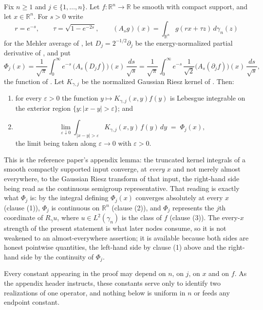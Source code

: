 \begin{lemma}
Fix $n \geq 1$ and $j \in \{1,\ldots,n\}$.  Let $f : \mathbb{R}^n \to \mathbb{R}$
be smooth with compact support, and let $x \in \mathbb{R}^n$.  For $s > 0$ write
\[
  r = e^{-s},\qquad \tau = \sqrt{1-e^{-2s}},\qquad
  (A_sg)(x) = \int_{\mathbb{R}^n} g(rx+\tau z)\,d\gamma_n(z)
\]
for the Mehler average of , let $D_j = 2^{-1/2}\partial_j$
be the energy-normalized partial derivative of , and put
\[
  \Phi_j(x) = \frac{1}{\sqrt\pi}\int_0^\infty
      e^{-s}\,\bigl(A_s(D_jf)\bigr)(x)\,\frac{ds}{\sqrt s}
    = \frac{1}{\sqrt\pi}\int_0^\infty
      e^{-s}\,\frac{1}{\sqrt2}\bigl(A_s(\partial_jf)\bigr)(x)\,\frac{ds}{\sqrt s} ,
\]
the function of .  Let $K_{\gamma,j}$ be the
normalized Gaussian Riesz kernel of .  Then:
\begin{enumerate}
\item for every $\varepsilon > 0$ the function $y \mapsto K_{\gamma,j}(x,y)f(y)$
is Lebesgue integrable on the exterior region $\{y : |x-y| > \varepsilon\}$; and
\item
\[
  \lim_{\varepsilon\downarrow0}
    \int_{|x-y|>\varepsilon}K_{\gamma,j}(x,y)\,f(y)\,dy
  \;=\; \Phi_j(x) ,
\]
the limit being taken along $\varepsilon \to 0$ with $\varepsilon > 0$.
\end{enumerate}

This is the reference paper's appendix lemma: the truncated kernel integrals of
a smooth compactly supported input converge, at \emph{every} $x$ and not merely
almost everywhere, to the Gaussian Riesz transform of that input, the
right-hand side being read as the continuous semigroup representative.  That
reading is exactly what $\Phi_j$ is: by  the
integral defining $\Phi_j(x)$ converges absolutely at every $x$ (clause (1)),
$\Phi_j$ is continuous on $\mathbb{R}^n$ (clause (2)), and $\Phi_j$ represents
the $j$th coordinate of $R_\gamma u$, where $u \in L^2(\gamma_n)$ is the class
of $f$ (clause (3)).  The every-$x$ strength of the present statement is what
later nodes consume, so it is not weakened to an almost-everywhere assertion;
it is available because both sides are honest pointwise quantities, the
left-hand side by clause (1) above and the right-hand side by the continuity of
$\Phi_j$.

Every constant appearing in the proof may depend on $n$, on $j$, on $x$ and on
$f$.  As the appendix header instructs, these constants serve only to identify
two realizations of one operator, and nothing below is uniform in $n$ or feeds
any endpoint constant.
\end{lemma}
